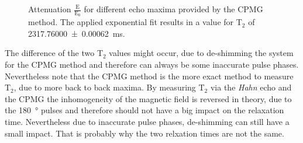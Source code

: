 \begin{figure}[H]
    \centering
    
    \caption[Attenuation $\frac{\text{E}}{\text{E}_0}$ for different echo maxima provided by the CPMG method.]{Attenuation $\frac{\text{E}}{\text{E}_0}$ for different echo maxima provided by the CPMG method. The applied exponential fit results in a value for T$_2$ of \SI{2317.76000 \pm 0.00062}{\milli \second}.}
    \label{fig:CPMG}
\end{figure}

The difference of the two T$_2$ values might occur, due to de-shimming the system for the CPMG method and therefore can always be some inaccurate pulse phases. Nevertheless note that the CPMG method is the more exact method to measure T$_2$, due to more back to back maxima. By measuring T$_2$ via the \textit{Hahn} echo and the CPMG the inhomogeneity of the magnetic field is reversed in theory, due to the \SI{180}{\degree} pulses and therefore should not have a big impact on the relaxation time. Nevertheless due to inaccurate pulse phases, de-shimming can still have a small impact. That is probably why the two relxation times are not the same.